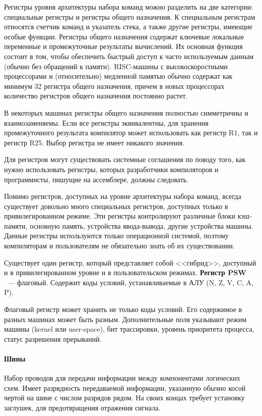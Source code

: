 \documentclass[10pt]{article}
\begin{document}
	Регистры уровня архитектуры набора команд можно разделить на две категории: специальные регистры и регистры общего назначения. К специальным регистрам относятся счетчик команд и указатель стека, а также другие регистры, имеющие особые функции. Регистры общего назначения содержат ключевые локальные переменные и промежуточные результаты вычислений. Их основная функция состоит в том, чтобы обеспечить быстрый доступ к часто используемым данным (обычно без обращений к памяти). RISC-машины с высокоскоростными процессорами и (относительно) медленной памятью обычно содержат как минимум 32 регистра общего назначения, причем в новых процессорах количество регистров общего назначения постоянно растет.

	В некоторых машинах регистры общего назначения полностью симметричны и взаимозаменяемы. Если все регистры эквивалентны, для хранения промежуточного результата компилятор может использовать как регистр R1, так и регистр R25. Выбор регистра не имеет никакого значения.

	Для регистров могут существовать системные соглашения по поводу того, как нужно использовать регистры, которых разработчики компиляторов и программисты, пишущие на ассемблере, должны следовать.

	Помимо регистров, доступных на уровне архитектуры набора команд, всегда существует довольно много специальных регистров, доступных только в привилегированном режиме. Эти регистры контролируют различные блоки кэш-памяти, основную память, устройства ввода-вывода, другие устройства машины. Данные регистры используются только операционной системой, поэтому компиляторам и пользователям не обязательно знать об их существовании.

	Существует один регистр, который представляет собой <<гибрид>>, доступный и в привилегированном уровне и в пользовательском режимах. \textbf{Регистр PSW} ~--- флаговый. Содержит коды условий, устанавливаемые в АЛУ (N, Z, V, C, A, P).

	Флаговый регистр может хранить не только коды условий. Его содержимое в разных машинах может быть разным. Дополнительные поля указывают режим машины (kernel или user-space), бит трассировки, уровень приоритета процесса, статус разрешения прерываний.
	\paragraph{Шины}
	Набор проводов для передачи информации между компонентами логических схем. Имеет разрядность передаваемой информации, указанную обычно косой чертой на шине с числом разрядов рядом. На своих концах требует установку заглушек, для предотвращения отражения сигнала.
\end{document}

